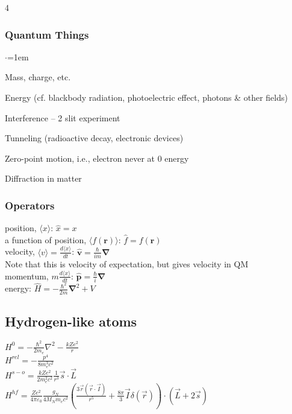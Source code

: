 \documentclass[letterpaper,landscape,10pt]{article}
\newenvironment{titemize}
{\begin{list}{$\cdot$}{\leftmargin=1em}
	\setlength{\itemsep}{0pt}
	\setlength{\parskip}{0pt}
	\setlength{\parsep}{0pt}}
{\end{list}}
\begin{document}
{\begin{multicols}{4}
  \subsubsection*{Quantum Things}
  	\begin{titemize}
  	  \item Mass, charge, etc.
	  \item Energy (cf. blackbody radiation, photoelectric effect,
		  photons \& other fields)
	  \item Interference -- 2 slit experiment
  	  \item Tunneling (radioactive decay, electronic devices)
  	  \item Zero-point motion, i.e., electron never at 0 energy 
  	  \item Diffraction in matter
  	\end{titemize}
  \subsubsection*{Operators}
  	\hspace{5pt}position, $\langle x \rangle$: $\hat{x} = x$ \\
	\hspace{5pt}a function of position, $\langle f(\bm{r})\rangle$: $\hat{f}=f(\bm{r})$ \\
	\hspace{5pt}velocity, $\langle v\rangle=\frac{d\langle x \rangle}{dt}$: $\hat{\bm{v}} = \frac{\hbar}{im}\bm\nabla$ \\
	\hspace{10pt}Note that this is velocity of expectation, but gives velocity in QM\\
	\hspace{5pt}momentum, $m\frac{d\langle x \rangle}{dt}$: $\hat{\bm{p}}=\frac{\hbar}{i}\bm\nabla$ \\
	\hspace{5pt}energy: $\hat H = -\frac{\hbar^2}{2m}\bm\nabla^2+V$

	\subsection*{Hydrogen-like atoms}
	\hspace{5pt} $H^0 = -\frac{\hbar^2}{2m_e}\nabla^2-\frac{kZe^2}{r}$ \\
	\hspace{5pt} $H^{rel}=-\frac{p^4}{8m_e^3c^2}$ \\
	\hspace{5pt} $H^{s-o}=\frac{kZe^2}{2m_e^2c^2}\frac{1}{r^3}\vec{s}\cdot\vec{L}$ \\
	\hspace{5pt} $H^{hf}=\frac{Ze^2}{4\pi\varepsilon_0}\frac{g_N}{4M_Nm_ec^2}\left( \frac{3\vec{r}(\vec{r}\cdot\vec{I})}{r^5} + \frac{8\pi}{3}\vec{I}\delta(\vec{r}) \right)\cdot(\vec{L}+2\vec{s}) $ \\
	\hspace{5pt} 
	\hspace{5pt} 



\end{multicols}}
\end{document}

